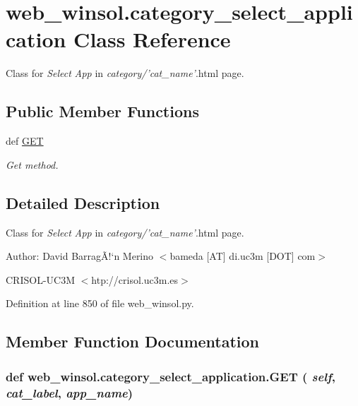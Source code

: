 \hypertarget{classweb__winsol_1_1category__select__application}{
\section{web\_\-winsol.category\_\-select\_\-application Class Reference}
\label{classweb__winsol_1_1category__select__application}
}
Class for {\em Select\/} {\em App\/} in {\em category/'cat\_\-name'\/}.html page.  


\subsection*{Public Member Functions}
\begin{CompactItemize}
\item 
def \hyperlink{classweb__winsol_1_1category__select__application_37ae2672cc3aec256c7460b85c6fa4a0}{GET}
\begin{CompactList}\small\item\em Get method. \item\end{CompactList}\end{CompactItemize}


\subsection{Detailed Description}
Class for {\em Select\/} {\em App\/} in {\em category/'cat\_\-name'\/}.html page. 

\begin{Desc}
\item[Author:]David Barrag\~{A}!`n Merino $<$bameda \mbox{[}AT\mbox{]} di.uc3m \mbox{[}DOT\mbox{]} com$>$ 

CRISOL-UC3M $<$htp://crisol.uc3m.es$>$ \end{Desc}




Definition at line 850 of file web\_\-winsol.py.

\subsection{Member Function Documentation}
\hypertarget{classweb__winsol_1_1category__select__application_37ae2672cc3aec256c7460b85c6fa4a0}{
\subsubsection[GET]{\setlength{\rightskip}{0pt plus 5cm}def web\_\-winsol.category\_\-select\_\-application.GET ( {\em self},  {\em cat\_\-label},  {\em app\_\-name})}}
\label{classweb__winsol_1_1category__select__application_37ae2672cc3aec256c7460b85c6fa4a0}


